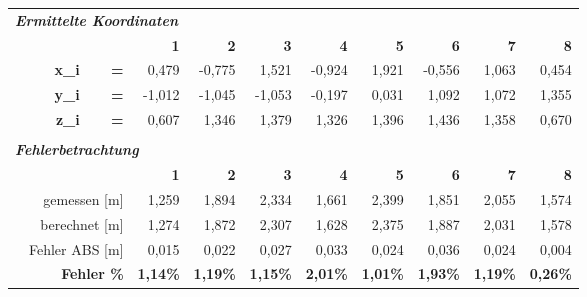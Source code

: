 \begin{table}[h]
\begin{tabular}{r|rrr|r|r|r|r|rrr}
    \multicolumn{11}{l}{\textit{\textbf{Ermittelte Koordinaten}}} \\
    \multicolumn{1}{r}{\textit{\textbf{}}} &       &       & \multicolumn{1}{r}{\textbf{1}} & \multicolumn{1}{r}{\textbf{2}} & \multicolumn{1}{r}{\textbf{3}} & \multicolumn{1}{r}{\textbf{4}} & \multicolumn{1}{r}{\textbf{5}} & \textbf{6} & \textbf{7} & \textbf{8}\\
\cline{2-11}    \multicolumn{1}{r}{} & \textbf{x\_i} & \textbf{=} & \multicolumn{1}{r}{0,479} & \multicolumn{1}{r}{-0,775} & \multicolumn{1}{r}{1,521} & \multicolumn{1}{r}{-0,924} & \multicolumn{1}{r}{1,921} & -0,556 & 1,063 & 0,454\\
    \multicolumn{1}{r}{} & \textbf{y\_i} & \textbf{=} & \multicolumn{1}{r}{-1,012} & \multicolumn{1}{r}{-1,045} & \multicolumn{1}{r}{-1,053} & \multicolumn{1}{r}{-0,197} & \multicolumn{1}{r}{0,031} & 1,092 & 1,072 & 1,355 \\
    \multicolumn{1}{r}{} & \textbf{z\_i} & \textbf{=} & \multicolumn{1}{r}{0,607} & \multicolumn{1}{r}{1,346} & \multicolumn{1}{r}{1,379} & \multicolumn{1}{r}{1,326} & \multicolumn{1}{r}{1,396} & 1,436 & 1,358 & 0,670 \\
    \multicolumn{1}{r}{} &       &       & \multicolumn{1}{r}{} & \multicolumn{1}{r}{} & \multicolumn{1}{r}{} & \multicolumn{1}{r}{} & \multicolumn{1}{r}{} &       &       &  \\
    \multicolumn{11}{l}{\textit{\textbf{Fehlerbetrachtung}}} \\
    \multicolumn{1}{r}{} &       &       & \multicolumn{1}{r}{\textbf{1}} & \multicolumn{1}{r}{\textbf{2}} & \multicolumn{1}{r}{\textbf{3}} & \multicolumn{1}{r}{\textbf{4}} & \multicolumn{1}{r}{\textbf{5}} & \textbf{6} & \textbf{7} & \textbf{8}\\
\cline{2-11}    \multicolumn{1}{r}{} & \multicolumn{2}{r}{gemessen [m]} & \multicolumn{1}{r}{1,259} & \multicolumn{1}{r}{1,894} & \multicolumn{1}{r}{2,334} & \multicolumn{1}{r}{1,661} & \multicolumn{1}{r}{2,399} & 1,851 & 2,055 & 1,574\\
    \multicolumn{1}{r}{} & \multicolumn{2}{r}{berechnet [m]} & \multicolumn{1}{r}{1,274} & \multicolumn{1}{r}{1,872} & \multicolumn{1}{r}{2,307} & \multicolumn{1}{r}{1,628} & \multicolumn{1}{r}{2,375} & 1,887 & 2,031 & 1,578 \\
    \multicolumn{1}{r}{} & \multicolumn{2}{r}{Fehler ABS [m]} & \multicolumn{1}{r}{0,015} & \multicolumn{1}{r}{0,022} & \multicolumn{1}{r}{0,027} & \multicolumn{1}{r}{0,033} & \multicolumn{1}{r}{0,024} & 0,036 & 0,024 & 0,004 \\
    \multicolumn{1}{r}{} & \multicolumn{2}{r}{\textbf{Fehler \%}} & \multicolumn{1}{r}{\textbf{1,14\%}} & \multicolumn{1}{r}{\textbf{1,19\%}} & \multicolumn{1}{r}{\textbf{1,15\%}} & \multicolumn{1}{r}{\textbf{2,01\%}} & \multicolumn{1}{r}{\textbf{1,01\%}} & \textbf{1,93\%} & \textbf{1,19\%} & \textbf{0,26\%} \\
    \end{tabular}%
\end{table}%
